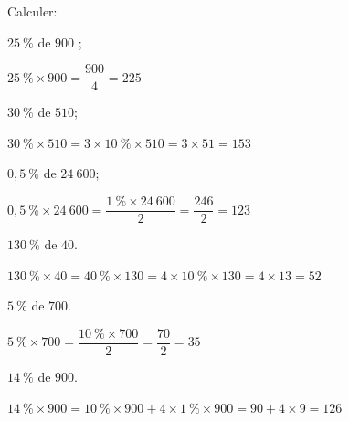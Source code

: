 \documentclass[11pt,a4paper]{article}  %
\begin{document}
Calculer:
	\begin{enumMet}
		\item $25\ \%$ de $900$ ;
		\begin{corrBox}
			$25\ \%\times 900=\dfrac{900}{4}=225$		
		\end{corrBox}
		\item $30\ \%$ de $510$;
		\begin{corrBox}
			$30\ \%\times 510=3\times 10\ \% \times 510=3\times 51=153$		
		\end{corrBox}
		\item $0,5\ \%$ de $24\ 600$;
		\begin{corrBox}
			$0,5\ \%\times 24\ 600=\dfrac{1\ \%\times 24\ 600}{2}=\dfrac{246}{2}=123$
		\end{corrBox}
		\item $130\ \%$ de $40$.
		\begin{corrBox}
			$130\ \%\times 40=40\ \%\times 130= 4\times 10\ \%\times 130=4\times 13=52$
		\end{corrBox}
		\item $5\ \%$ de $700$.
		\begin{corrBox}
			$5\ \%\times 700=\dfrac{10\ \%\times 700}{2}=\dfrac{70}{2}=35$
		\end{corrBox}
		\item $14\ \%$ de $900$.
		\begin{corrBox}
			$14\ \%\times 900=10\ \%\times 900+4\times 1\ \%\times 900=90+4\times 9=126$
		\end{corrBox}
	\end{enumMet}
\end{document}
